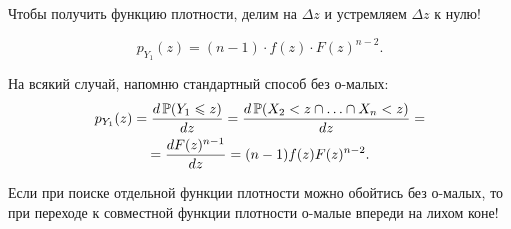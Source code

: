 \begin{myex}
Чтобы получить функцию плотности, делим на $ \Delta z $ и устремляем $ \Delta z $ к нулю!

\begin{equation}
p_{Y_{1}}(z)=(n-1)\cdot f(z)\cdot F(z)^{n-2}.
\end{equation}


На всякий случай, напомню стандартный способ без о-малых:
\begin{multline}
p_{Y_{1}}(z)=\frac{d\P(Y_{1}\leq z)}{dz}=\frac{d \P(X_{2}<z\cap\ldots\cap X_{n}<z)}{dz}=\\
=\frac{dF(z)^{n-1}}{dz}=(n-1)f(z)F(z)^{n-2}.
\end{multline}
\end{myex}



Если при поиске отдельной функции плотности можно обойтись без о-малых, то при переходе к совместной функции плотности о-малые впереди на лихом коне!

